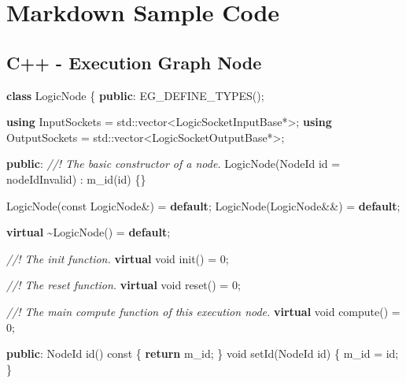 \documentclass[
  12pt,
  british,
  a4paper,
  twoside,
  titlepage,
  openright,
  numbers=noenddot,
  chapterprefix=true,
  headings=optiontohead,
  svgnames,
  dvipsnames]{scrreprt}
\newenvironment{Shaded}{}{}
\newcommand{\AttributeTok}[1]{\textcolor[rgb]{0.49,0.56,0.16}{#1}}
\newcommand{\BuiltInTok}[1]{#1}
\newcommand{\CommentTok}[1]{\textcolor[rgb]{0.38,0.63,0.69}{\textit{#1}}}
\newcommand{\ControlFlowTok}[1]{\textcolor[rgb]{0.00,0.44,0.13}{\textbf{#1}}}
\newcommand{\DataTypeTok}[1]{\textcolor[rgb]{0.56,0.13,0.00}{#1}}
\newcommand{\DecValTok}[1]{\textcolor[rgb]{0.25,0.63,0.44}{#1}}
\newcommand{\KeywordTok}[1]{\textcolor[rgb]{0.00,0.44,0.13}{\textbf{#1}}}
\newcommand{\NormalTok}[1]{#1}
\newcommand{\VariableTok}[1]{\textcolor[rgb]{0.10,0.09,0.49}{#1}}
\begin{document}
\hypertarget{markdown-sample-code}{%
\chapter{Markdown Sample Code}\label{markdown-sample-code}}

\hypertarget{c---execution-graph-node}{%
\section{C++ - Execution Graph Node}\label{c---execution-graph-node}}

\begin{Shaded}
\begin{Highlighting}[numbers=left,,]
\KeywordTok{class}\NormalTok{ LogicNode}
\NormalTok{\{}
\KeywordTok{public}\NormalTok{:}
\NormalTok{    EG\_DEFINE\_TYPES();}

    \KeywordTok{using}\NormalTok{ InputSockets  = }\BuiltInTok{std::}\NormalTok{vector\textless{}LogicSocketInputBase*\textgreater{};}
    \KeywordTok{using}\NormalTok{ OutputSockets = }\BuiltInTok{std::}\NormalTok{vector\textless{}LogicSocketOutputBase*\textgreater{};}

\KeywordTok{public}\NormalTok{:}
    \CommentTok{//! The basic constructor of a node.}
\NormalTok{    LogicNode(NodeId id = nodeIdInvalid)}
\NormalTok{        : }\VariableTok{m\_id}\NormalTok{(id)}
\NormalTok{    \{\}}

\NormalTok{    LogicNode(}\AttributeTok{const}\NormalTok{ LogicNode\&) = }\ControlFlowTok{default}\NormalTok{;}
\NormalTok{    LogicNode(LogicNode\&\&)      = }\ControlFlowTok{default}\NormalTok{;}

    \KeywordTok{virtual}\NormalTok{ \textasciitilde{}LogicNode() = }\ControlFlowTok{default}\NormalTok{;}

    \CommentTok{//! The init function.}
    \KeywordTok{virtual} \DataTypeTok{void}\NormalTok{ init() = }\DecValTok{0}\NormalTok{;}

    \CommentTok{//! The reset function.}
    \KeywordTok{virtual} \DataTypeTok{void}\NormalTok{ reset() = }\DecValTok{0}\NormalTok{;}

    \CommentTok{//! The main compute function of this execution node.}
    \KeywordTok{virtual} \DataTypeTok{void}\NormalTok{ compute() = }\DecValTok{0}\NormalTok{;}

\KeywordTok{public}\NormalTok{:}
\NormalTok{    NodeId id() }\AttributeTok{const}\NormalTok{ \{ }\ControlFlowTok{return} \VariableTok{m\_id}\NormalTok{; \}}
    \DataTypeTok{void}\NormalTok{ setId(NodeId id) \{ }\VariableTok{m\_id}\NormalTok{ = id; \}}


\end{Highlighting}
\end{Shaded}
\end{document}
